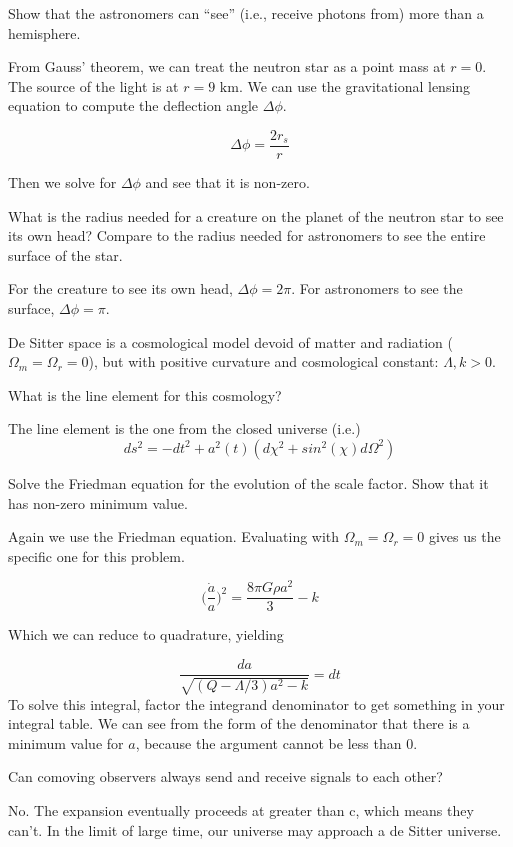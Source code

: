 \documentclass[11pt,largemargins]{homework}
\begin{document}
\begin{alphaparts}
\questionpart
Show that the astronomers can ``see'' (i.e., receive photons from) more than a hemisphere.

From Gauss' theorem, we can treat the neutron star as a point mass at $r=0$.  The source of the light is at $r = 9 \mbox{ km}$.  We can use the gravitational lensing equation to compute the deflection angle $\Delta \phi$.

$$\Delta \phi = \frac{2r_s}{r}$$ 

Then we solve for $\Delta \phi$ and see that it is non-zero.

\questionpart
What is the radius needed for a creature on the planet of the neutron star to see its own head?  Compare to the radius needed for astronomers to see the entire surface of the star.

For the creature to see its own head, $\Delta \phi = 2\pi$.  For astronomers to see the surface, $\Delta \phi = \pi$.

\end{alphaparts}

\question
De Sitter space is a cosmological model devoid of matter and radiation ($\Omega_{m} = \Omega_{r} = 0$), but with positive curvature and cosmological constant: $\Lambda, k > 0$. 


\begin{alphaparts}
\questionpart
What is the line element for this cosmology?

The line element is the one from the closed universe (i.e.)
\begin{equation}
ds^2 = -dt^2 + a^2(t)(d \chi^2 + sin^2 (\chi) d\Omega^2)
\end{equation}

\questionpart
Solve the Friedman equation for the evolution of the scale factor.  Show that it has non-zero minimum value.

Again we use the Friedman equation.  Evaluating with $\Omega_{m} = \Omega_{r} = 0$ gives us
the specific one for this problem.

$$
\Big( \frac{\dot{a}}{a} \Big)^2 = \frac{8 \pi G \rho a^2}{3} - k
$$

Which we can reduce to quadrature, yielding

$$
\frac{da}{\sqrt{(Q - \Lambda/3)a^2 - k}} = dt
$$
To solve this integral, factor the integrand denominator to get something in your integral table.  We can see from the form of the denominator that there is a minimum value for $a$, because the argument cannot be less than 0.

\questionpart
Can comoving observers always send and receive signals to each other? 

No.  The expansion eventually proceeds at greater than c, which means they can't.  In the limit of large time, our universe may approach a de Sitter universe.

\end{alphaparts}
\end{document}
